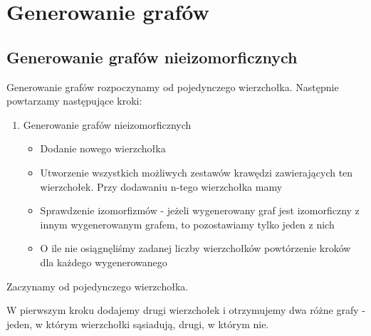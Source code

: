 \documentclass[11pt]{article}
\begin{document}
\section{Generowanie grafów}
\subsection{Generowanie grafów nieizomorficznych} 
Generowanie grafów rozpoczynamy od pojedynczego wierzchołka. Następnie powtarzamy następujące kroki:
\begin{enumerate}
 \item Generowanie grafów nieizomorficznych 

 \begin{itemize}
 \item  Dodanie nowego wierzchołka  

 \item Utworzenie wszystkich możliwych zestawów krawędzi zawierających ten wierzchołek. Przy dodawaniu n-tego wierzchołka mamy 

 \item Sprawdzenie izomorfizmów - jeżeli wygenerowany graf jest izomorficzny z innym wygenerowanym grafem, to pozostawiamy tylko jeden z nich 

 \item  O ile nie osiągnęliśmy zadanej liczby wierzchołków powtórzenie kroków dla każdego wygenerowanego  
 \end{itemize}
\end{enumerate}

Zaczynamy od pojedynczego wierzchołka.


W pierwszym kroku dodajemy drugi wierzchołek i otrzymujemy dwa różne grafy - jeden, w którym wierzchołki sąsiadują, drugi, w którym nie. 
\end{document}
